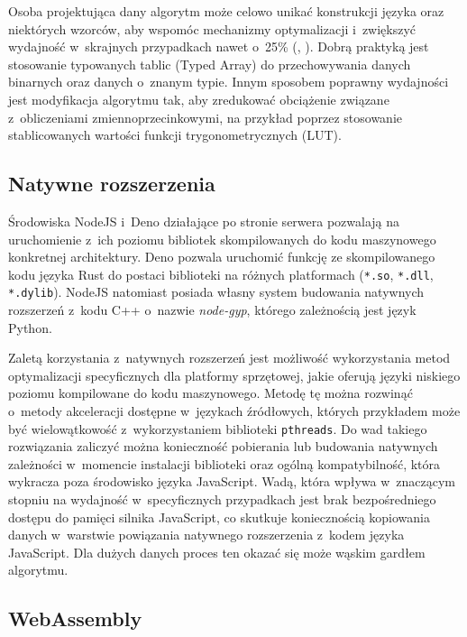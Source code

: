 Osoba projektująca dany algorytm może celowo unikać konstrukcji języka oraz niektórych wzorców, aby wspomóc mechanizmy optymalizacji i~zwiększyć wydajność w~skrajnych przypadkach nawet o~25\% (\cite{gong2015jitprof}, \cite{selakovic2016performance}). Dobrą praktyką jest stosowanie typowanych tablic (Typed Array) do przechowywania danych binarnych oraz danych o~znanym typie. Innym sposobem poprawny wydajności jest modyfikacja algorytmu tak, aby zredukować obciążenie związane z~obliczeniami zmiennoprzecinkowymi, na przykład poprzez stosowanie stablicowanych wartości funkcji trygonometrycznych (LUT).

\subsection{Natywne rozszerzenia}

Środowiska NodeJS i~Deno działające po stronie serwera pozwalają na uruchomienie z~ich poziomu bibliotek skompilowanych do kodu maszynowego konkretnej architektury. Deno pozwala uruchomić funkcję ze skompilowanego kodu języka Rust do postaci biblioteki na różnych platformach (\lstinline{*.so}, \lstinline{*.dll}, \lstinline{*.dylib}). NodeJS natomiast posiada własny system budowania natywnych rozszerzeń z~kodu C++ o~nazwie \textit{node-gyp}, którego zależnością jest język Python.

Zaletą korzystania z~natywnych rozszerzeń jest możliwość wykorzystania metod optymalizacji specyficznych dla platformy sprzętowej, jakie oferują języki niskiego poziomu kompilowane do kodu maszynowego. Metodę tę można rozwinąć o~metody akceleracji dostępne w~językach źródłowych, których przykładem może być wielowątkowość z~wykorzystaniem biblioteki \lstinline{pthreads}. Do wad takiego rozwiązania zaliczyć można konieczność pobierania lub budowania natywnych zależności w~momencie instalacji biblioteki oraz ogólną kompatybilność, która wykracza poza środowisko języka JavaScript. Wadą, która wpływa w~znaczącym stopniu na wydajność w~specyficznych przypadkach jest brak bezpośredniego dostępu do pamięci silnika JavaScript, co skutkuje koniecznością kopiowania danych w~warstwie powiązania natywnego rozszerzenia z~kodem języka JavaScript. Dla dużych danych proces ten okazać się może wąskim gardłem algorytmu.

\subsection{WebAssembly}

